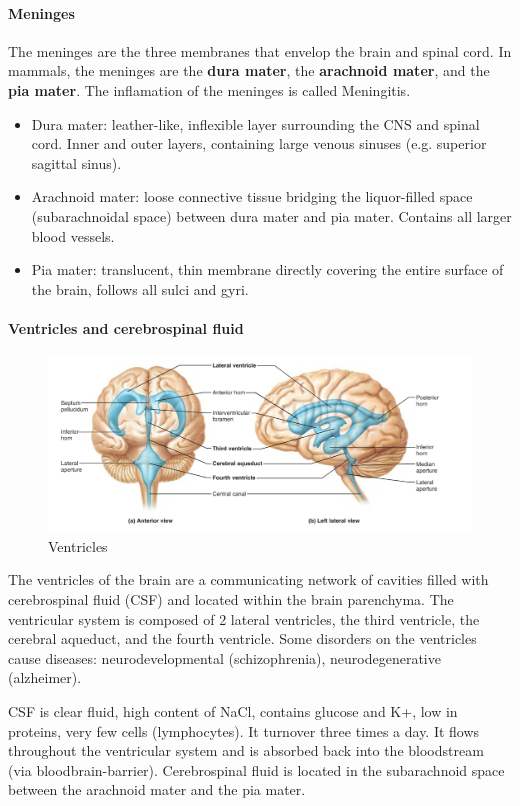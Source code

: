 \documentclass[12pt,article,oneside,a4paper]{memoir}
\begin{document}
\paragraph{Meninges}
The meninges are the three membranes that envelop the brain and spinal cord. In mammals, the meninges are the \textbf{dura mater}, the \textbf{arachnoid mater}, and the \textbf{pia mater}. The inflamation of the meninges is called Meningitis.
\begin{itemize}
\item Dura mater: leather-like, inflexible layer surrounding the CNS and spinal cord. Inner and outer layers, containing large venous sinuses (e.g. superior sagittal sinus).
\item Arachnoid mater: loose connective tissue bridging the liquor-filled space (subarachnoidal space) between dura mater and pia mater. Contains all larger blood vessels.
\item Pia mater: translucent, thin membrane directly covering the entire surface of the brain, follows all sulci and gyri.
\end{itemize}

\paragraph{Ventricles and cerebrospinal fluid}
\begin{figure}
	\centering
  	\includegraphics[width=\linewidth]{imgs/ventricles-of-brain.png}
	\caption{Ventricles}
  	\label{fig:cranialNerves}
\end{figure}
The ventricles of the brain are a communicating network of cavities filled with cerebrospinal fluid (CSF) and located within the brain parenchyma. The ventricular system is composed of 2 lateral ventricles, the third ventricle, the cerebral aqueduct, and the fourth ventricle.
Some disorders on the ventricles cause diseases: neurodevelopmental (schizophrenia), neurodegenerative (alzheimer).

CSF is clear fluid, high content of NaCl, contains glucose and K+, low in proteins, very few cells (lymphocytes). It turnover three times a day. It flows throughout the ventricular system and is absorbed back into the bloodstream (via bloodbrain-barrier).
Cerebrospinal fluid is located in the subarachnoid space between the arachnoid mater and the pia mater.
\end{document}
